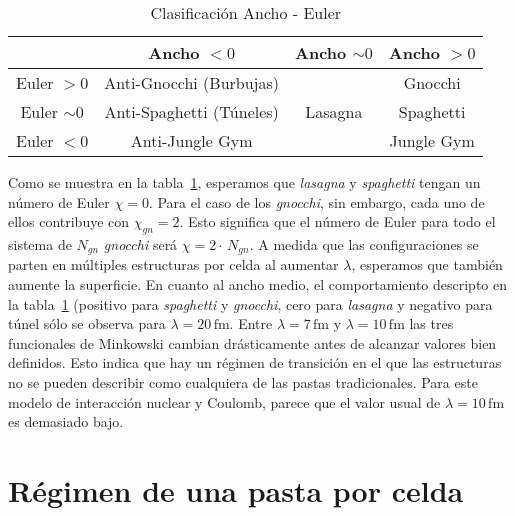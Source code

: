 \begin{table}[ht] \centering
\caption{Clasificación Ancho - Euler}
\begin{tabular}{c|| c | c | c} \hline & Ancho $<0$ & Ancho
$\sim 0$ & Ancho $>0$ \\
               
\hline\hline Euler $>0$ & Anti-Gnocchi (Burbujas) & & Gnocchi \\

Euler $\sim0$ & Anti-Spaghetti (Túneles) & Lasagna & Spaghetti \\

Euler $<0$ & Anti-Jungle Gym & & Jungle Gym \\ [1ex] \hline
\end{tabular}
\label{tab:mink}
\end{table}

Como se muestra en la tabla~\ref{tab:mink}, esperamos que \emph{lasagna} y \emph{spaghetti} tengan un número de Euler $\chi=0$.
Para el caso de los \emph{gnocchi}, sin embargo, cada uno de ellos contribuye con $\chi_{gn}=2$.
Esto significa que el número de Euler para todo el sistema de $N_{gn}$ \emph{gnocchi} será $\chi=2\cdot\,N_{gn}$.
A medida que las configuraciones se parten en múltiples estructuras por celda al aumentar $\lambda$, esperamos que también aumente la superficie.
En cuanto al ancho medio, el comportamiento descripto en la tabla~\ref{tab:mink} (positivo para \emph{spaghetti} y \emph{gnocchi}, cero para \emph{lasagna} y negativo para túnel sólo se observa para $\lambda=20\,\text{fm}$.
Entre $\lambda=7\,\text{fm}$ y $\lambda=10\,\text{fm}$ las tres funcionales de Minkowski cambian drásticamente antes de alcanzar valores bien definidos.
Esto indica que hay un régimen de transición en el que las estructuras no se pueden describir como cualquiera de las pastas tradicionales.
Para este modelo de interacción nuclear y Coulomb, parece que el valor usual de $\lambda=10\,\text{fm}$ es demasiado bajo.


\section{Régimen de una pasta por celda} \label{pasta-bup}

